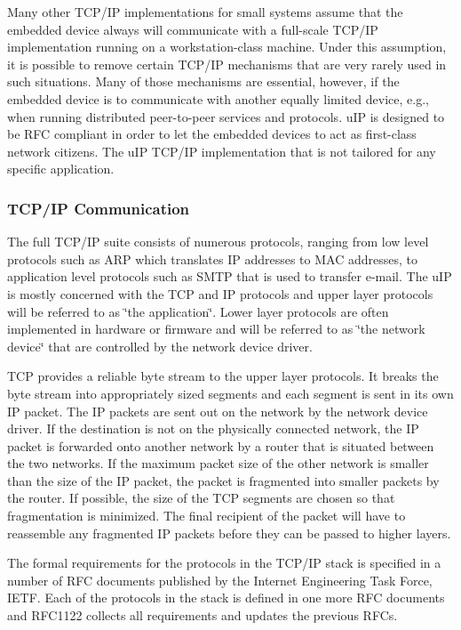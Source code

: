 Many other T\+C\+P/\+IP implementations for small systems assume that the embedded device always will communicate with a full-\/scale T\+C\+P/\+IP implementation running on a workstation-\/class machine. Under this assumption, it is possible to remove certain T\+C\+P/\+IP mechanisms that are very rarely used in such situations. Many of those mechanisms are essential, however, if the embedded device is to communicate with another equally limited device, e.\+g., when running distributed peer-\/to-\/peer services and protocols. u\+IP is designed to be R\+FC compliant in order to let the embedded devices to act as first-\/class network citizens. The u\+IP T\+C\+P/\+IP implementation that is not tailored for any specific application.\hypertarget{a00074_uip-tcpip}{}\subsubsection{T\+C\+P/\+I\+P Communication}\label{a00074_uip-tcpip}
The full T\+C\+P/\+IP suite consists of numerous protocols, ranging from low level protocols such as A\+RP which translates IP addresses to M\+AC addresses, to application level protocols such as S\+M\+TP that is used to transfer e-\/mail. The u\+IP is mostly concerned with the T\+CP and IP protocols and upper layer protocols will be referred to as \char`\"{}the
application\char`\"{}. Lower layer protocols are often implemented in hardware or firmware and will be referred to as \char`\"{}the network device\char`\"{} that are controlled by the network device driver.

T\+CP provides a reliable byte stream to the upper layer protocols. It breaks the byte stream into appropriately sized segments and each segment is sent in its own IP packet. The IP packets are sent out on the network by the network device driver. If the destination is not on the physically connected network, the IP packet is forwarded onto another network by a router that is situated between the two networks. If the maximum packet size of the other network is smaller than the size of the IP packet, the packet is fragmented into smaller packets by the router. If possible, the size of the T\+CP segments are chosen so that fragmentation is minimized. The final recipient of the packet will have to reassemble any fragmented IP packets before they can be passed to higher layers.

The formal requirements for the protocols in the T\+C\+P/\+IP stack is specified in a number of R\+FC documents published by the Internet Engineering Task Force, I\+E\+TF. Each of the protocols in the stack is defined in one more R\+FC documents and R\+F\+C1122 collects all requirements and updates the previous R\+F\+Cs.

